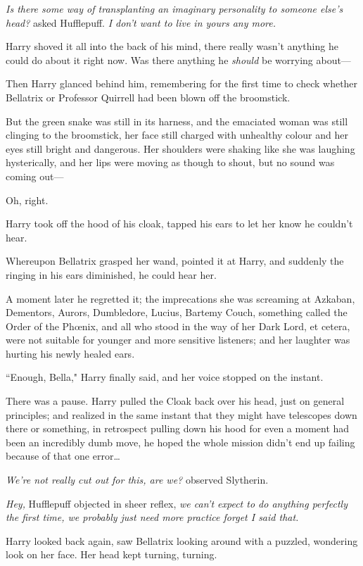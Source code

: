 \emph{Is there some way of transplanting an imaginary personality to someone else's head?} asked Hufflepuff. \emph{I don't want to live in yours any more.}

Harry shoved it all into the back of his mind, there really wasn't anything he could do about it right now. Was there anything he \emph{should} be worrying about—

Then Harry glanced behind him, remembering for the first time to check whether Bellatrix or Professor Quirrell had been blown off the broomstick.

But the green snake was still in its harness, and the emaciated woman was still clinging to the broomstick, her face still charged with unhealthy colour and her eyes still bright and dangerous. Her shoulders were shaking like she was laughing hysterically, and her lips were moving as though to shout, but no sound was coming out—

Oh, right.

Harry took off the hood of his cloak, tapped his ears to let her know he couldn't hear.

Whereupon Bellatrix grasped her wand, pointed it at Harry, and suddenly the ringing in his ears diminished, he could hear her.

A moment later he regretted it; the imprecations she was screaming at Azkaban, Dementors, Aurors, Dumbledore, Lucius, Bartemy Couch, something called the Order of the Phœnix, and all who stood in the way of her Dark Lord, et cetera, were not suitable for younger and more sensitive listeners; and her laughter was hurting his newly healed ears.

``Enough, Bella," Harry finally said, and her voice stopped on the instant.

There was a pause. Harry pulled the Cloak back over his head, just on general principles; and realized in the same instant that they might have telescopes down there or something, in retrospect pulling down his hood for even a moment had been an incredibly dumb move, he hoped the whole mission didn't end up failing because of that one error…

\emph{We're not really cut out for this, are we?} observed Slytherin.

\emph{Hey,} Hufflepuff objected in sheer reflex, \emph{we can't expect to do anything perfectly the first time, we probably just need more practice \emph{forget I said that}.}

Harry looked back again, saw Bellatrix looking around with a puzzled, wondering look on her face. Her head kept turning, turning.

